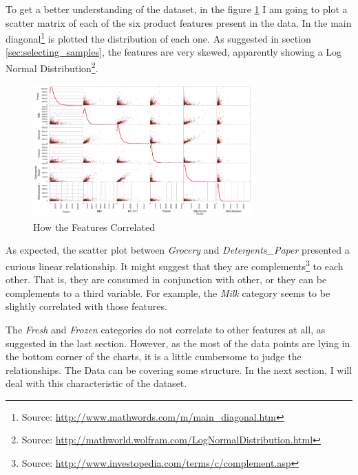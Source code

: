 \documentclass[a4paper]{article}
\begin{document}
To get a better understanding of the dataset, in the figure \ref{fig:scatter_matrix} I am going to plot a scatter matrix of each of the six product features present in the data. In the main diagonal\footnote{Source: \url{http://www.mathwords.com/m/main_diagonal.htm}} is plotted the distribution of each one. As suggested in section \ref{sec:selecting_samples}, the features are very skewed, apparently showing a Log Normal Distribution\footnote{Source: \url{http://mathworld.wolfram.com/LogNormalDistribution.html}}.

\begin{figure}[ht!]
\centering
\includegraphics[width=0.75\textwidth]{figures/scatter_matrix.png}
\caption{\label{fig:scatter_matrix}How the Features Correlated}
\end{figure}

As expected, the scatter plot between \textit{Grocery} and \textit{Detergents\_Paper} presented a curious linear relationship. It might suggest that they are complements\footnote{Source: \url{http://www.investopedia.com/terms/c/complement.asp}} to each other. That is, they are consumed in conjunction with other, or they can be complements to a third variable. For example, the \textit{Milk} category seems to be slightly correlated with those features.

The \textit{Fresh} and \textit{Frozen} categories do not correlate to other features at all, as suggested in the last section. However, as the most of the data points are lying in the bottom corner of the charts, it is a little cumbersome to judge the relationships. The Data can be covering some structure. In the next section, I will deal with this characteristic of the dataset.

\end{document}
